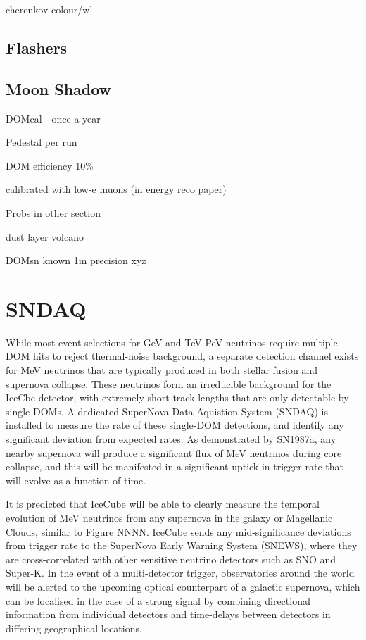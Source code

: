 cherenkov colour/wl

\subsection*{Flashers}
\subsection*{Moon Shadow}

DOMcal - once a year

Pedestal per run

DOM efficiency 10\%

calibrated with low-e muons (in energy reco paper)

Probs in other section 

dust layer volcano

DOMsn known 1m precision xyz



\section{SNDAQ}

While most event selections for GeV and TeV-PeV neutrinos require multiple DOM hits to reject thermal-noise background, a separate detection channel exists for MeV neutrinos that are typically produced in both stellar fusion and supernova collapse. These neutrinos form an irreducible background for the IceCbe detector, with extremely short track lengths that are only detectable by single DOMs. A dedicated SuperNova Data Aquistion System (SNDAQ) is installed to measure the rate of these single-DOM detections, and identify any significant deviation from expected rates. As demonstrated by SN1987a, any nearby supernova will produce a significant flux of MeV neutrinos during core collapse, and this will be manifested in a significant uptick in trigger rate that will evolve as a function of time. 

It is predicted that IceCube will be able to clearly measure the temporal evolution of MeV neutrinos from any supernova in the galaxy or Magellanic Clouds, similar to Figure NNNN. IceCube sends any mid-significance deviations from trigger rate to the SuperNova Early Warning System (SNEWS), where they are cross-correlated with other sensitive neutrino detectors such as SNO and Super-K. In the event of a multi-detector trigger, observatories around the world will be alerted to the upcoming optical counterpart of a galactic supernova, which can be localised in the case of a strong signal by combining directional information from individual detectors and time-delays between detectors in differing geographical locations. 

